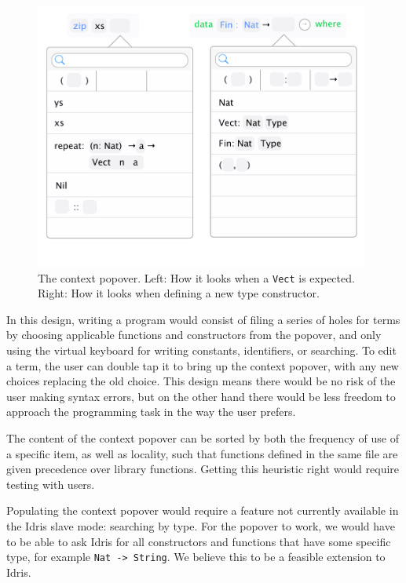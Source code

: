 \begin{figure}
	\centering
		\includegraphics[width=110mm]{diagrams/final_design_popover.pdf}
	\caption{The context popover. Left: How it looks when a \texttt{Vect} is
	expected. Right: How it looks when defining a new type constructor.}
\label{fig:new_design_popover}
\end{figure}

In this design, writing a program would consist of filing a series of holes for terms by choosing applicable functions and constructors from the popover, and only using the virtual keyboard for writing constants, identifiers, or searching.
To edit a term, the user can double tap it to bring up the context popover, with any new choices replacing the old choice.
This design means there would be no risk of the user making syntax errors, but on the other hand there would be less freedom to approach the programming task in the way the user
prefers.

The content of the context popover can be sorted by both the frequency of use of a specific item, as well as locality, such that functions defined in the same file are given precedence over library functions.
Getting this heuristic right would require testing with users.

Populating the context popover would require a feature not currently available in the Idris slave mode: searching by type.
For the popover to work, we would have to be able to ask Idris for all constructors and functions that have some specific type, for example \texttt{Nat -> String}.
We believe this to be a feasible extension to Idris. 

